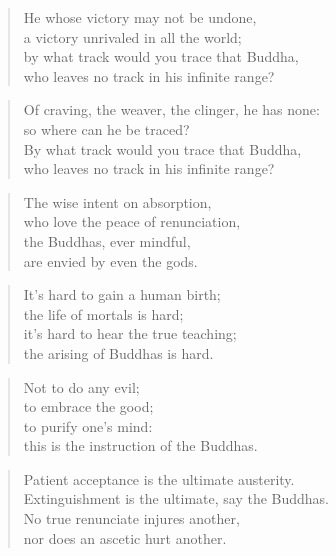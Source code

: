 \documentclass[12pt,openany]{book}%
\begin{document}
\begin{verse}%
He whose victory may not be undone, \\
a victory unrivaled in all the world; \\
by what track would you trace that Buddha, \\
who leaves no track in his infinite range? 

%
\end{verse}

\begin{verse}%
Of craving, the weaver, the clinger, he has none: \\
so where can he be traced? \\
By what track would you trace that Buddha, \\
who leaves no track in his infinite range? 

%
\end{verse}

\begin{verse}%
The wise intent on absorption, \\
who love the peace of renunciation, \\
the Buddhas, ever mindful, \\
are envied by even the gods. 

%
\end{verse}

\begin{verse}%
It’s hard to gain a human birth; \\
the life of mortals is hard; \\
it’s hard to hear the true teaching; \\
the arising of Buddhas is hard. 

%
\end{verse}

\begin{verse}%
Not to do any evil; \\
to embrace the good; \\
to purify one’s mind: \\
this is the instruction of the Buddhas. 

%
\end{verse}

\begin{verse}%
Patient acceptance is the ultimate austerity. \\
Extinguishment is the ultimate, say the Buddhas. \\
No true renunciate injures another, \\
nor does an ascetic hurt another. 

%
\end{verse}
\end{document}
